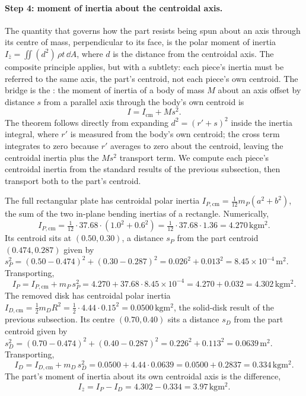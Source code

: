 \paragraph{Step 4: moment of inertia about the centroidal axis.} The
quantity that governs how the part resists being spun about an axis
through its centre of mass, perpendicular to its face, is the polar
moment of inertia $I_{\bar{z}} = \iint(d^{2})\,\rho t\,\dd A$, where
$d$ is the distance from the centroidal axis. The composite principle
applies, but with a subtlety: each piece's inertia must be referred
to the same axis, the part's centroid, not each piece's own centroid.
The bridge is the : the moment of
inertia of a body of mass $M$ about an axis offset by distance $s$
from a parallel axis through the body's own centroid is
\[
I = I_{\text{cm}} + M s^{2}.
\]
The theorem follows directly from expanding $d^{2} = (r' + s)^{2}$
inside the inertia integral, where $r'$ is measured from the body's
own centroid; the cross term integrates to zero because $r'$ averages
to zero about the centroid, leaving the centroidal inertia plus the
$M s^{2}$ transport term. We compute each piece's centroidal inertia
from the standard results of the previous subsection, then transport
both to the part's centroid.

The full rectangular plate has centroidal polar inertia $I_{P,
\text{cm}} = \tfrac{1}{12} m_{P}(a^{2} + b^{2})$, the sum of the two
in-plane bending inertias of a rectangle. Numerically,
\[
I_{P, \text{cm}} = \tfrac{1}{12}\cdot 37.68\cdot(1.0^{2} + 0.6^{2})
= \tfrac{1}{12}\cdot 37.68\cdot 1.36 = 4.270\,\si{\kilogram\meter
\squared}.
\]
Its centroid sits at $(0.50, 0.30)$, a distance $s_{P}$ from the
part centroid $(0.474, 0.287)$ given by $s_{P}^{2} = (0.50 -
0.474)^{2} + (0.30 - 0.287)^{2} = 0.026^{2} + 0.013^{2} = 8.45\times
10^{-4}\,\si{\meter\squared}$. Transporting,
\[
I_{P} = I_{P, \text{cm}} + m_{P}\,s_{P}^{2}
= 4.270 + 37.68\cdot 8.45\times 10^{-4}
= 4.270 + 0.032 = 4.302\,\si{\kilogram\meter\squared}.
\]
The removed disk has centroidal polar inertia $I_{D, \text{cm}} =
\tfrac{1}{2} m_{D} R^{2} = \tfrac{1}{2}\cdot 4.44\cdot 0.15^{2} =
0.0500\,\si{\kilogram\meter\squared}$, the solid-disk result of the
previous subsection. Its centre $(0.70, 0.40)$ sits a distance
$s_{D}$ from the part centroid given by $s_{D}^{2} = (0.70 - 0.474)
^{2} + (0.40 - 0.287)^{2} = 0.226^{2} + 0.113^{2} = 0.0639\,\si{
\meter\squared}$. Transporting,
\[
I_{D} = I_{D, \text{cm}} + m_{D}\,s_{D}^{2}
= 0.0500 + 4.44\cdot 0.0639
= 0.0500 + 0.2837 = 0.334\,\si{\kilogram\meter\squared}.
\]
The part's moment of inertia about its own centroidal axis is the
difference,
\[
I_{\bar{z}} = I_{P} - I_{D} = 4.302 - 0.334 =
3.97\,\si{\kilogram\meter\squared}.
\]

